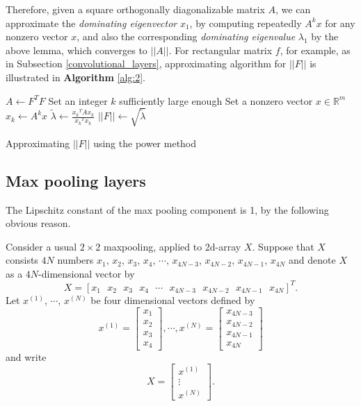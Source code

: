 \documentclass[12pt]{report}
\numberwithin{figure}{chapter}
\theoremstyle{plain}
\theoremstyle{definition}
\theoremstyle{corollary}
\theoremstyle{definition}
\theoremstyle{plain}
\theoremstyle{definition}
\theoremstyle{plain}
\begin{document}
Therefore, given a square orthogonally diagonalizable matrix $A$, we can approximate the \emph{dominating eigenvector} $x_1$, by computing repeatedly $A^kx$ for any nonzero vector $x$, and also the corresponding \emph{dominating eigenvalue} $\lambda_1$ by the above lemma, which converges to $||A||$.
For rectangular matrix \(f\), for example, as in Subsection \ref{convolutional_layers}, approximating algorithm for \(||F||\) is illustrated in \textbf{Algorithm} \ref{alg:2}.


\begin{algorithm}
\(A\gets F^TF\)\;
Set an integer \(k\) sufficiently large enough\;
Set a nonzero vector \(x\in\mathbb R^m\)\;
\(x_k\gets A^kx\)\;
\(\tilde\lambda\gets\frac{{x_k}^TAx_k}{{x_k}^Tx_k}\)\;
\(||F||\gets\sqrt{\tilde\lambda}\)
\caption{Approximating \(||F||\) using the power method}
\label{alg:2}
\end{algorithm}

\subsection{Max pooling layers}

The Lipschitz constant of the max pooling component is 1, by the following obvious reason.

Consider a usual \(2\times 2\) maxpooling, applied to 2d-array \(X\).
Suppose that \(X\) consists \(4N\) numbers \(x_1\), \(x_2\), \(x_3\), \(x_4\), \(\cdots\), \(x_{4N-3}\), \(x_{4N-2}\), \(x_{4N-1}\), \(x_{4N}\) and denote \(X\) as a \(4N\)-dimensional vector by
\[X=[x_1\:\:\:x_2\:\:\:x_3\:\:\:x_4\:\:\:\cdots\:\:\:x_{4N-3}\:\:\:x_{4N-2}\:\:\:x_{4N-1}\:\:\:x_{4N}]^T.\]
Let \(x^{(1)}\), \(\cdots\), \(x^{(N)}\) be four dimensional vectors defined by
\[x^{(1)}=\begin{bmatrix}x_1\\x_2\\x_3\\x_4\end{bmatrix},\cdots,x^{(N)}=\begin{bmatrix}x_{4N-3}\\x_{4N-2}\\x_{4N-1}\\x_{4N}\end{bmatrix}\]
and write
\[X=\begin{bmatrix}x^{(1)}\\\vdots\\x^{(N)}\end{bmatrix}.\]
\end{document}
